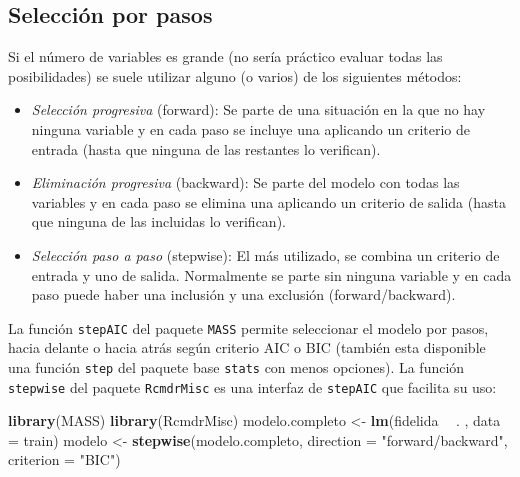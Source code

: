 \documentclass[
  spanish,
]{book}
\newenvironment{Shaded}{\begin{snugshade}}{\end{snugshade}}
\newcommand{\DataTypeTok}[1]{\textcolor[rgb]{0.13,0.29,0.53}{#1}}
\newcommand{\KeywordTok}[1]{\textcolor[rgb]{0.13,0.29,0.53}{\textbf{#1}}}
\newcommand{\NormalTok}[1]{#1}
\newcommand{\OperatorTok}[1]{\textcolor[rgb]{0.81,0.36,0.00}{\textbf{#1}}}
\newcommand{\StringTok}[1]{\textcolor[rgb]{0.31,0.60,0.02}{#1}}
\theoremstyle{break}
\theoremstyle{definition}
\theoremstyle{definition}
\theoremstyle{definition}
\theoremstyle{remark}
\begin{document}
\hypertarget{selecciuxf3n-por-pasos}{%
\subsection{Selección por pasos}\label{selecciuxf3n-por-pasos}}

Si el número de variables es grande (no sería práctico evaluar todas las posibilidades)
se suele utilizar alguno (o varios) de los siguientes métodos:

\begin{itemize}
\item
  \emph{Selección progresiva} (forward): Se parte de una situación en la
  que no hay ninguna variable y en cada paso se incluye una aplicando
  un criterio de entrada (hasta que ninguna de las restantes lo
  verifican).
\item
  \emph{Eliminación progresiva} (backward): Se parte del modelo con todas
  las variables y en cada paso se elimina una aplicando un criterio
  de salida (hasta que ninguna de las incluidas lo verifican).
\item
  \emph{Selección paso a paso} (stepwise): El más utilizado, se combina
  un criterio de entrada y uno de salida. Normalmente se parte sin
  ninguna variable y en cada paso puede haber una inclusión y una
  exclusión (forward/backward).
\end{itemize}

La función \texttt{stepAIC} del paquete \texttt{MASS} permite seleccionar el modelo por pasos, hacia delante o hacia atrás según criterio AIC o BIC (también esta disponible una función \texttt{step} del paquete base \texttt{stats} con menos opciones).
La función \texttt{stepwise} del paquete \texttt{RcmdrMisc} es una interfaz de \texttt{stepAIC} que facilita su uso:

\begin{Shaded}
\begin{Highlighting}[]
\KeywordTok{library}\NormalTok{(MASS)}
\KeywordTok{library}\NormalTok{(RcmdrMisc)}
\NormalTok{modelo.completo <-}\StringTok{ }\KeywordTok{lm}\NormalTok{(fidelida }\OperatorTok{~}\StringTok{ }\NormalTok{. , }\DataTypeTok{data =}\NormalTok{ train)}
\NormalTok{modelo <-}\StringTok{ }\KeywordTok{stepwise}\NormalTok{(modelo.completo, }\DataTypeTok{direction =} \StringTok{"forward/backward"}\NormalTok{, }\DataTypeTok{criterion =} \StringTok{"BIC"}\NormalTok{)}
\end{Highlighting}
\end{Shaded}
\end{document}
